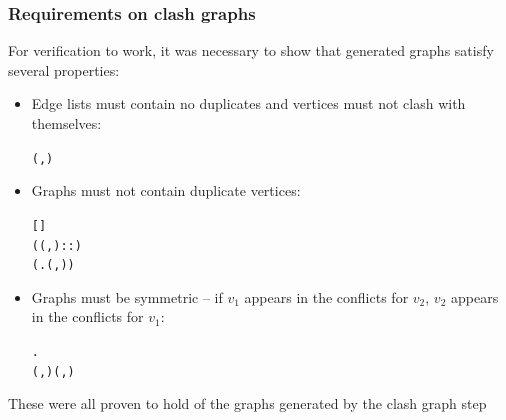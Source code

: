 \documentclass{beamer}
\begin{document}
\begin{frame}[containsverbatim]
\frametitle{Requirements on clash graphs}
For verification to work, it was necessary to show that generated graphs satisfy several properties:

\begin{itemize}
	\item Edge lists must contain no duplicates and vertices must not clash with themselves:
	
	\begin{alltt}\small
		 (,) \HOLTokenEquiv{}
 \HOLTokenNotIn{}   \HOLTokenConj{}  
	\end{alltt}
	
	\item Graphs must not contain duplicate vertices:
	
	\begin{alltt}\small
		 [] \HOLTokenEquiv{} 
 ((,)::) \HOLTokenEquiv{}
(\HOLTokenForall{}. (,) \HOLTokenNotIn{}  ) \HOLTokenConj{}  
	\end{alltt}
\end{itemize}
\end{frame}

\begin{frame}[containsverbatim]
\begin{itemize}
	\item Graphs must be symmetric -- if $v_1$ appears in the conflicts for $v_2$, $v_2$ appears in the conflicts for $v_1$:
	
	\begin{alltt}\small
		  \HOLTokenEquiv{}
\HOLTokenForall{}   .
   (,)  \HOLTokenConj{}  (,)  \HOLTokenConj{}    \HOLTokenImp{}   
	\end{alltt}
\end{itemize}

These were all proven to hold of the graphs generated by the clash graph step
\end{frame}
\end{document}
